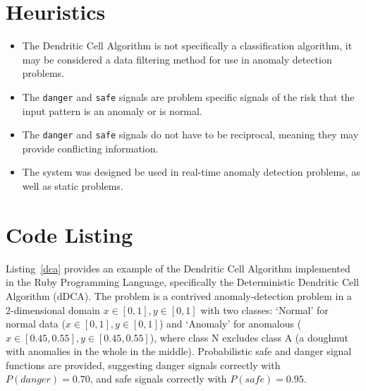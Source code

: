 \documentclass[a4paper, 11pt]{article}
\begin{document}
\section{Heuristics}
\label{sec:heuristics}
\begin{itemize}
	\item The Dendritic Cell Algorithm is not specifically a classification algorithm, it may be considered a data filtering method for use in anomaly detection problems.
	\item The \texttt{danger} and \texttt{safe} signals are problem specific signals of the risk that the input pattern is an anomaly or is normal.
	\item The \texttt{danger} and \texttt{safe} signals do not have to be reciprocal, meaning they may provide conflicting information.
	\item The system was designed be used in real-time anomaly detection problems, as well as static problems.
\end{itemize}

\section{Code Listing}
\label{sec:code}
Listing~\ref{dca} provides an example of the Dendritic Cell Algorithm implemented in the Ruby Programming Language, specifically the Deterministic Dendritic Cell Algorithm (dDCA).
The problem is a contrived anomaly-detection problem in a 2-dimensional domain $x\in[0,1], y\in[0,1]$ with two classes: `Normal' for normal data ($x\in[0,1], y\in[0,1]$) and `Anomaly' for anomalous ($x\in[0.45,0.55], y\in[0.45,0.55]$), where class N excludes class A (a doughnut with anomalies in the whole in the middle). Probabilistic safe and danger signal functions are provided, suggesting danger signals correctly with $P(danger)=0.70$, and safe signals correctly with $P(safe)=0.95$.
\end{document}
